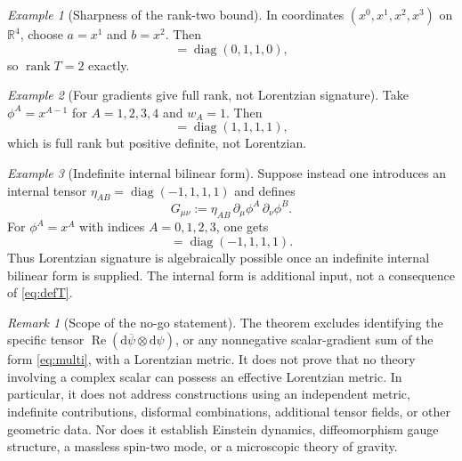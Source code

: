 \documentclass[11pt]{article}
\theoremstyle{remark}
\newtheorem{remark}{Remark}
\newtheorem{example}{Example}
\newcommand{\rank}{\operatorname{rank}}
\newcommand{\RePart}{\operatorname{Re}}
\newcommand{\dd}{\mathrm{d}}
\begin{document}
\begin{example}[Sharpness of the rank-two bound]
In coordinates $(x^0,x^1,x^2,x^3)$ on $\mathbb R^4$, choose
$a=x^1$ and $b=x^2$.  Then
\begin{equation}
 [T]=\operatorname{diag}(0,1,1,0),
\end{equation}
so $\rank T=2$ exactly.
\end{example}

\begin{example}[Four gradients give full rank, not Lorentzian signature]
Take $\phi^A=x^{A-1}$ for $A=1,2,3,4$ and $w_A=1$.  Then
\begin{equation}
 [S]=\operatorname{diag}(1,1,1,1),
\end{equation}
which is full rank but positive definite, not Lorentzian.
\end{example}

\begin{example}[Indefinite internal bilinear form]
Suppose instead one introduces an internal tensor
$\eta_{AB}=\operatorname{diag}(-1,1,1,1)$ and defines
\begin{equation}
 G_{\mu\nu}:=\eta_{AB}\,
  \partial_\mu\phi^A\,\partial_\nu\phi^B.
\end{equation}
For $\phi^A=x^A$ with indices $A=0,1,2,3$, one gets
\begin{equation}
 [G]=\operatorname{diag}(-1,1,1,1).
\end{equation}
Thus Lorentzian signature is algebraically possible once an
indefinite internal bilinear form is supplied.  The internal form
is additional input, not a consequence of \eqref{eq:defT}.
\end{example}

\begin{remark}[Scope of the no-go statement]
The theorem excludes identifying the specific tensor
$\RePart(\dd\overline\psi\otimes\dd\psi)$, or any nonnegative
scalar-gradient sum of the form \eqref{eq:multi}, with a Lorentzian
metric.  It does not prove that no theory involving a complex scalar
can possess an effective Lorentzian metric.  In particular, it does
not address constructions using an independent metric, indefinite
contributions, disformal combinations, additional tensor fields,
or other geometric data.  Nor does it establish Einstein dynamics,
diffeomorphism gauge structure, a massless spin-two mode, or a
microscopic theory of gravity.
\end{remark}
\end{document}
